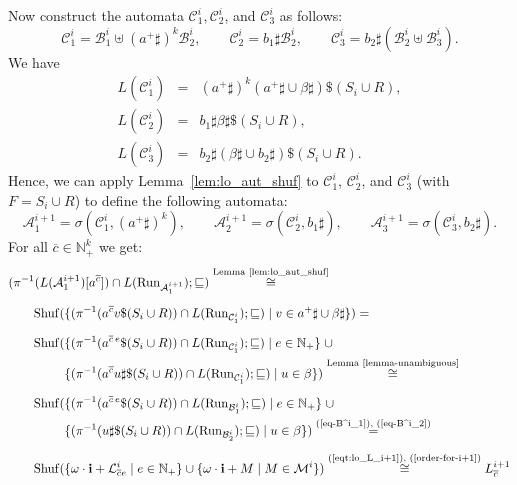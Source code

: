 \documentclass[envcountsame]{llncs}
\newcommand{\A}{\mathcal A}
\newcommand{\B}{\mathcal B}
\newcommand{\C}{\mathcal C}
\renewcommand{\L}{\mathcal L}
\newcommand{\N}{\mathbb N}
\newcommand{\M}{\mathcal M}
\renewcommand{\L}{\mathcal L}
\newcommand{\Run}{\mathrm{Run}}
\newcommand{\Shuf}{\mathrm{Shuf}}
\begin{document}
Now construct the automata $\C^{i}_1, \C^{i}_2$, and $\C^{i}_3$ as follows:
\[
\C^{i}_1 =  \B^i_1 \uplus (a^+\sharp)^{k}\B^i_2, \qquad 
\C^{i}_2 = b_1\sharp \B^i_2, \qquad 
\C^{i}_3 = b_2\sharp (\B^i_2\uplus \B^i_3).
\]
We have
\begin{eqnarray*}
    L(\C^{i}_1) & = & (a^+\sharp)^{k} (a^+\sharp \cup \beta\sharp) \$ (S_i\cup R), \\
    L(\C^{i}_2) & = & b_1 \sharp \beta \sharp \$ (S_i\cup R),\\
    L(\C^{i}_3) & = & b_2 \sharp (\beta \sharp \cup b_2 \sharp) \$ (S_i\cup R).
\end{eqnarray*}
Hence, we can apply Lemma~\ref{lem:lo_aut_shuf} to $\C^{i}_1$, $\C^{i}_2$, and
$\C^{i}_3$ (with $F = S_i \cup R$) to define the following automata:
\[
  \A^{i+1}_1 =  \sigma(\C^i_1, (a^+\sharp)^{k}), \qquad 
  \A^{i+1}_2 = \sigma(\C^i_2,b_1\sharp), \qquad \A^{i+1}_3 = \sigma(\C^i_3, b_2\sharp).
\]
For all $\overline{c}\in \N^k_+$ we get:
\begin{align*}
& (\pi^{-1}(L(\A^{i+1}_1)[a^{\overline{c}}]) \cap L(\Run_{\A^{i+1}_1}); \sqsubseteq) 
\stackrel{\text{Lemma~\ref{lem:lo_aut_shuf}}}{\cong} \\[2mm]
& \qquad \Shuf(\{(\pi^{-1}(a^{\overline{c}} v \$ (S_i \cup R)) \cap
L(\Run_{\C^i_1}); \sqsubseteq) \mid v\in a^+\sharp \cup \beta \sharp \}) = \\[2mm]
& \qquad \Shuf(\{(\pi^{-1}(a^{\overline{c}\,e} \$ (S_i \cup R)) \cap
                  L(\Run_{\C^i_1}); \sqsubseteq) \mid e \in \N_+ \} \; \cup \\
& \qquad \phantom{\Shuf(} \{(\pi^{-1}(a^{\overline{c}} u \sharp \$ (S_i \cup R)) \cap
                  L(\Run_{\C^i_1}); \sqsubseteq) \mid u \in \beta \}) \stackrel{\text{Lemma~\ref{lemma-unambiguous}}}{\cong}  \\[2mm]
& \qquad \Shuf(\{(\pi^{-1}(a^{\overline{c}\,e} \$ (S_i \cup R)) \cap
                  L(\Run_{\B^i_1}); \sqsubseteq) \mid e \in \N_+ \} \; \cup \\
& \qquad \phantom{\Shuf(} \{(\pi^{-1}(u \sharp \$ (S_i \cup R)) \cap
                  L(\Run_{\B^i_2}); \sqsubseteq) \mid u \in \beta \})
                           \stackrel{\text{(\ref{eq-B^i_1}), (\ref{eq-B^i_2})}}{=}
                           \\[2mm]
& \qquad \Shuf(\{\omega\cdot \mathbf{i}+\L^i_{\overline{c} e} \mid e\in \N_+\} \cup
    \{\omega\cdot \mathbf{i}+M \mid M\in \M^i\}) 
   \stackrel{\text{(\ref{eqt:lo_L_i+1}), (\ref{order-for-i+1})}}{\cong}  L^{i+1}_{\overline{c}} 
\end{align*}
\end{document}
